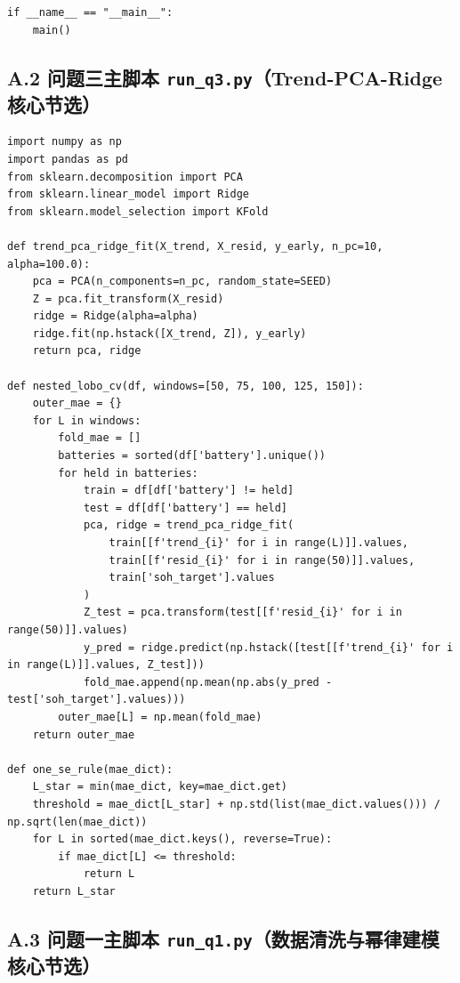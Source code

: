 \documentclass[12pt,a4paper]{article}
\begin{document}
\begin{appendices}
\begin{lstlisting}[caption={问题四：双层策略优化核心逻辑},label={lst:q4}]
if __name__ == "__main__":
    main()
\end{lstlisting}

\subsection*{A.2 问题三主脚本 \texttt{run\_q3.py}（Trend-PCA-Ridge 核心节选）}

\begin{lstlisting}[caption={问题三：Trend-PCA-Ridge 轨迹预测},label={lst:q3}]
import numpy as np
import pandas as pd
from sklearn.decomposition import PCA
from sklearn.linear_model import Ridge
from sklearn.model_selection import KFold

def trend_pca_ridge_fit(X_trend, X_resid, y_early, n_pc=10, alpha=100.0):
    pca = PCA(n_components=n_pc, random_state=SEED)
    Z = pca.fit_transform(X_resid)
    ridge = Ridge(alpha=alpha)
    ridge.fit(np.hstack([X_trend, Z]), y_early)
    return pca, ridge

def nested_lobo_cv(df, windows=[50, 75, 100, 125, 150]):
    outer_mae = {}
    for L in windows:
        fold_mae = []
        batteries = sorted(df['battery'].unique())
        for held in batteries:
            train = df[df['battery'] != held]
            test = df[df['battery'] == held]
            pca, ridge = trend_pca_ridge_fit(
                train[[f'trend_{i}' for i in range(L)]].values,
                train[[f'resid_{i}' for i in range(50)]].values,
                train['soh_target'].values
            )
            Z_test = pca.transform(test[[f'resid_{i}' for i in range(50)]].values)
            y_pred = ridge.predict(np.hstack([test[[f'trend_{i}' for i in range(L)]].values, Z_test]))
            fold_mae.append(np.mean(np.abs(y_pred - test['soh_target'].values)))
        outer_mae[L] = np.mean(fold_mae)
    return outer_mae

def one_se_rule(mae_dict):
    L_star = min(mae_dict, key=mae_dict.get)
    threshold = mae_dict[L_star] + np.std(list(mae_dict.values())) / np.sqrt(len(mae_dict))
    for L in sorted(mae_dict.keys(), reverse=True):
        if mae_dict[L] <= threshold:
            return L
    return L_star
\end{lstlisting}

\subsection*{A.3 问题一主脚本 \texttt{run\_q1.py}（数据清洗与幂律建模核心节选）}


\end{appendices}
\end{document}
